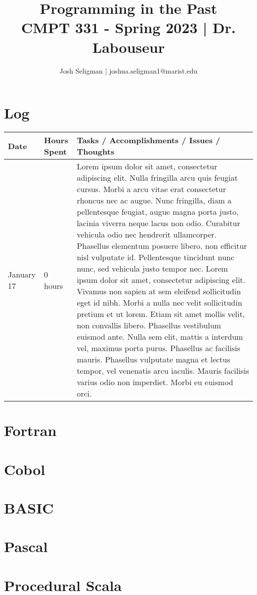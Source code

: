 \documentclass[letterpaper, 10pt, DIV=13]{scrartcl}
\title {
	\normalfont
	\huge{Programming in the Past} \\
	\vspace{10pt}
	\large{CMPT 331 - Spring 2023 | Dr. Labouseur}
}
\author{\normalfont Josh Seligman | joshua.seligman1@marist.edu}
\numberwithin{equation}{section}
\numberwithin{figure}{section}
\numberwithin{table}{section}
\begin{document}
\maketitle

\section{Log}

\begin{center}
	\begin{tabular}{|p{1in}|p{1in}|p{4in}|}
		\hline
		Date & Hours Spent & Tasks / Accomplishments / Issues / Thoughts \\
		\hline
		January 17 & 0 hours & Lorem ipsum dolor sit amet, consectetur adipiscing elit. Nulla fringilla arcu quis feugiat cursus. Morbi a arcu vitae erat consectetur rhoncus nec ac augue. Nunc fringilla, diam a pellentesque feugiat, augue magna porta justo, lacinia viverra neque lacus non odio. Curabitur vehicula odio nec hendrerit ullamcorper. Phasellus elementum posuere libero, non efficitur nisl vulputate id. Pellentesque tincidunt nunc nunc, sed vehicula justo tempor nec. Lorem ipsum dolor sit amet, consectetur adipiscing elit. Vivamus non sapien at sem eleifend sollicitudin eget id nibh. Morbi a nulla nec velit sollicitudin pretium et ut lorem. Etiam sit amet mollis velit, non convallis libero. Phasellus vestibulum euismod ante. Nulla sem elit, mattis a interdum vel, maximus porta purus. Phasellus ac facilisis mauris. Phasellus vulputate magna et lectus tempor, vel venenatis arcu iaculis. Mauris facilisis varius odio non imperdiet. Morbi eu euismod orci.  \\
		\hline
	\end{tabular}
\end{center}

\section{Fortran}

\section{Cobol}

\section{BASIC}

\section{Pascal}

\section{Procedural Scala}
\end{document}

